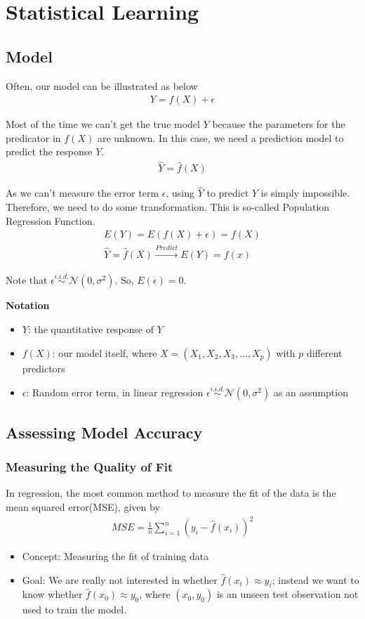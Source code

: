 \documentclass[12pt,a4paper]{article}%
\theoremstyle{definition}
\theoremstyle{plain}
\numberwithin{equation}{section}
\begin{document}
\setcounter{section}{1}
\section{Statistical Learning}
\subsection{\textbf{Model}}
Often, our model can be illustrated as below
\begin{gather}
Y = f(X) + \epsilon
\end{gather}

Most of the time we can't get the true model $Y$ because the parameters for the predicator in $f(X)$ are unknown.
In this case, we need a prediction model to predict the response $Y$.
\begin{gather}
\hat{Y} = \hat{f}(X)
\end{gather}

As we can't measure the error term $\epsilon$, using $\hat{Y}$ to predict $Y$ is simply impossible.
Therefore, we need to do some transformation. This is so-called Population Regression Function.
\begin{gather}
E(Y) = E(f(X) + \epsilon) = f(X) \\
\hat{Y} = \hat{f}(X) \stackrel{Predict}{\longrightarrow} E(Y)=f(x)
\end{gather}

Note that $\epsilon \stackrel{i.i.d.}{\sim} \mathcal{N}(0,\sigma^{2}) $. So, $E(\epsilon)=0$.

\textbf{Notation}
\begin{itemize}
\item $Y$: the quantitative response of $Y$
\item $f(X)$: our model itself, where $X = (X_{1},X_{2},X_{3},\dots,X_{p})$ with $p$ different predictors
\item $\epsilon$: Random error term, in linear regression $\epsilon \stackrel{i.i.d.}{\sim} \mathcal{N}(0,\sigma^{2}) $ as an assumption
\end{itemize}


\subsection{\textbf{Assessing Model Accuracy}}
\subsubsection{\textbf{Measuring the Quality of Fit}}
In regression, the most common method to measure the fit of the data is the mean squared error(MSE), given by
\begin{gather}
MSE = \frac{1}{n}\sum\limits_{i=1}^{n}(y_{i}-\hat{f}(x_{i}))^2
\end{gather}
\begin{itemize}
\item Concept: Measuring the fit of training data
\item Goal: We are really not interested in whether $\hat{f}(x_{i}) \approx  y_{i}$; instead we want to know whether $\hat{f}(x_{0}) \approx y_{0}$, where $(x_{0},y_{0})$ is an unseen test observation not used to train the model.
\end{itemize}
\end{document}
